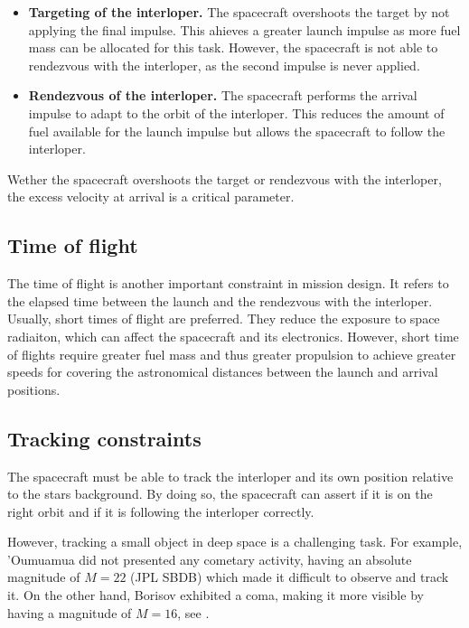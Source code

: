 \begin{itemize}

  \item \textbf{Targeting of the interloper.} The spacecraft overshoots the target by
        not applying the final impulse. This ahieves a greater launch
        impulse as more fuel mass can be allocated for this task. However, the
        spacecraft is not able to rendezvous with the interloper, as the second
        impulse is never applied.

  \item \textbf{Rendezvous of the interloper.} The spacecraft performs the
        arrival impulse to adapt to the orbit of the interloper. This reduces the
        amount of fuel available for the launch impulse but allows the spacecraft to
        follow the interloper.

\end{itemize}

Wether the spacecraft overshoots the target or rendezvous with the interloper,
the excess velocity at arrival is a critical parameter.

\subsection{Time of flight}

The time of flight is another important constraint in mission design. It refers
to the elapsed time between the launch and the rendezvous with the interloper.
Usually, short times of flight are preferred. They reduce the exposure to space
radiaiton, which can affect the spacecraft and its electronics. However, short
time of flights require greater fuel mass and thus greater propulsion to achieve
greater speeds for covering the astronomical distances between the launch and
arrival positions.

\subsection{Tracking constraints}

The spacecraft must be able to track the interloper and its own position
relative to the stars background. By doing so, the spacecraft can assert if it
is on the right orbit and if it is following the interloper correctly.

However, tracking a small object in deep space is a challenging task. For
example, 'Oumuamua did not presented any cometary activity, having an absolute
magnitude of $M = 22$ (JPL SBDB) which made it difficult to observe and track
it. On the other hand, Borisov exhibited a coma, making it more visible by
having a magnitude of $M = 16$, see \cite{jewitt2020}.
